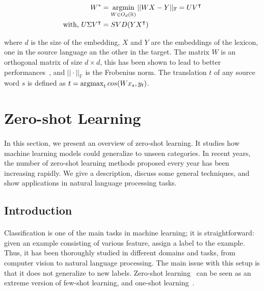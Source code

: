 \begin{equation}
\begin{split}
    W^* & = \operatorname*{argmin}_{W \in O_d(\mathbb{R})} ||WX-Y||_\mathbb{F} = UV^{\intercal} \\
    \text{with, } U\Sigma V^\intercal & = SVD(YX^\intercal) 
\end{split}
    \label{eq:word_alignment}
\end{equation}

where $d$ is the size of the embedding, $X$ and $Y$ are the embeddings of the lexicon, one in the source language an the other in the target. The matrix $W$ is an orthogonal matrix of size $d\times d$, this has been shown to lead to better performances~\citep{xing-etal-2015-normalized}, and $||\cdot||_{\mathbb{F}}$ is the Frobenius norm. The translation $t$ of any source word $s$ is defined as $t = \operatorname*{argmax}_t cos(W x_s, y_t)$.




\section{Zero-shot Learning} 
\label{sec:zero_learning}

\paragraph{}

In this section, we  present an overview of zero-shot learning. It studies how machine learning models could generalize to unseen categories.  In recent years, the number of zero-shot learning methods proposed every year has been increasing rapidly. We give a description, discuss some general techniques, and show applications in natural language processing tasks. %

\subsection{Introduction}
\paragraph{}
Classification is one of the main tasks in machine learning; it is straightforward: given an example consisting of various feature, assign a label to the example. Thus, it has been thoroughly studied in different domains and tasks, from computer vision to natural language processing.  The main issue with this setup is that it does not generalize to new labels. Zero-shot learning~\citep{larochelle2008zeroshot} can be seen as an extreme version of few-shot learning, and one-shot learning~\citep{miller2002oneshot}.

